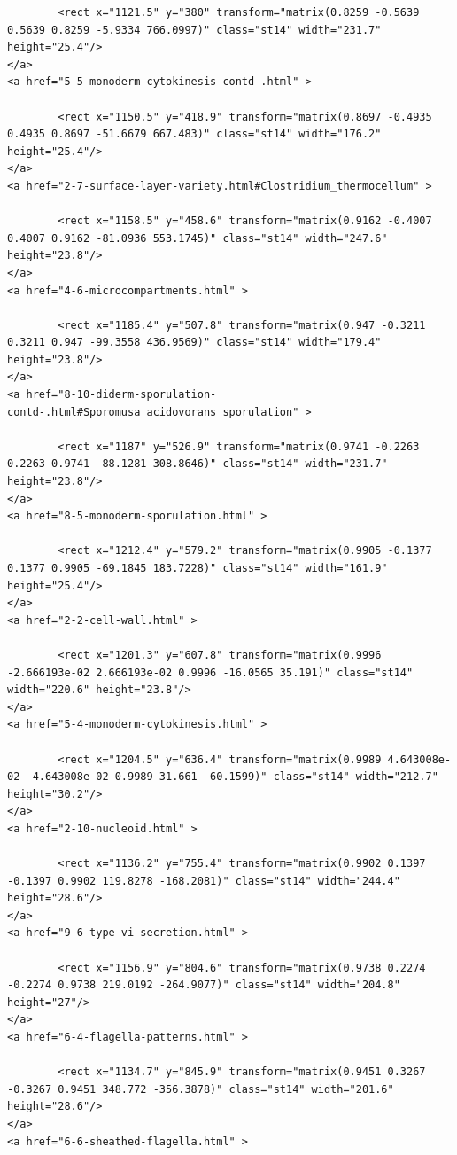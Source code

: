 \documentclass[]{tufte-book}
\begin{document}
\begin{verbatim}
        <rect x="1121.5" y="380" transform="matrix(0.8259 -0.5639 0.5639 0.8259 -5.9334 766.0997)" class="st14" width="231.7" height="25.4"/>
</a>
<a href="5-5-monoderm-cytokinesis-contd-.html" >

        <rect x="1150.5" y="418.9" transform="matrix(0.8697 -0.4935 0.4935 0.8697 -51.6679 667.483)" class="st14" width="176.2" height="25.4"/>
</a>
<a href="2-7-surface-layer-variety.html#Clostridium_thermocellum" >

        <rect x="1158.5" y="458.6" transform="matrix(0.9162 -0.4007 0.4007 0.9162 -81.0936 553.1745)" class="st14" width="247.6" height="23.8"/>
</a>
<a href="4-6-microcompartments.html" >

        <rect x="1185.4" y="507.8" transform="matrix(0.947 -0.3211 0.3211 0.947 -99.3558 436.9569)" class="st14" width="179.4" height="23.8"/>
</a>
<a href="8-10-diderm-sporulation-contd-.html#Sporomusa_acidovorans_sporulation" >

        <rect x="1187" y="526.9" transform="matrix(0.9741 -0.2263 0.2263 0.9741 -88.1281 308.8646)" class="st14" width="231.7" height="23.8"/>
</a>
<a href="8-5-monoderm-sporulation.html" >

        <rect x="1212.4" y="579.2" transform="matrix(0.9905 -0.1377 0.1377 0.9905 -69.1845 183.7228)" class="st14" width="161.9" height="25.4"/>
</a>
<a href="2-2-cell-wall.html" >

        <rect x="1201.3" y="607.8" transform="matrix(0.9996 -2.666193e-02 2.666193e-02 0.9996 -16.0565 35.191)" class="st14" width="220.6" height="23.8"/>
</a>
<a href="5-4-monoderm-cytokinesis.html" >

        <rect x="1204.5" y="636.4" transform="matrix(0.9989 4.643008e-02 -4.643008e-02 0.9989 31.661 -60.1599)" class="st14" width="212.7" height="30.2"/>
</a>
<a href="2-10-nucleoid.html" >

        <rect x="1136.2" y="755.4" transform="matrix(0.9902 0.1397 -0.1397 0.9902 119.8278 -168.2081)" class="st14" width="244.4" height="28.6"/>
</a>
<a href="9-6-type-vi-secretion.html" >

        <rect x="1156.9" y="804.6" transform="matrix(0.9738 0.2274 -0.2274 0.9738 219.0192 -264.9077)" class="st14" width="204.8" height="27"/>
</a>
<a href="6-4-flagella-patterns.html" >

        <rect x="1134.7" y="845.9" transform="matrix(0.9451 0.3267 -0.3267 0.9451 348.772 -356.3878)" class="st14" width="201.6" height="28.6"/>
</a>
<a href="6-6-sheathed-flagella.html" >


\end{verbatim}
\end{document}
